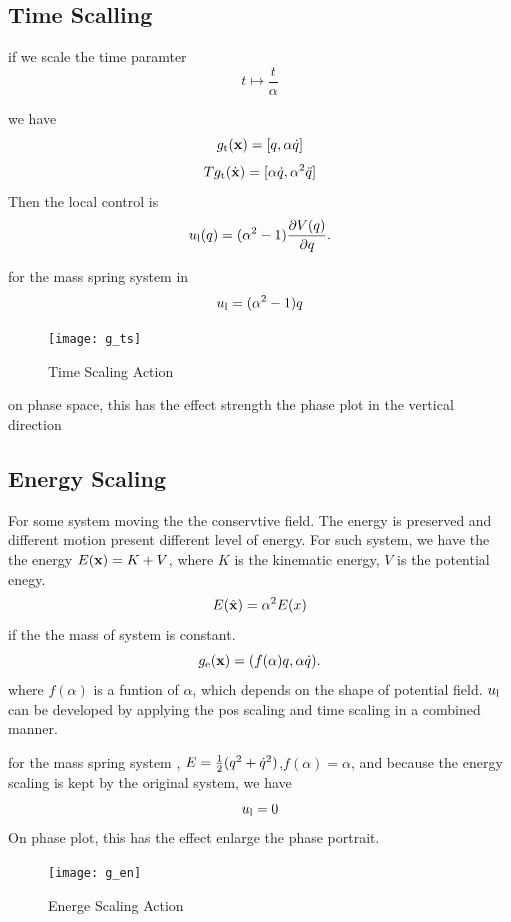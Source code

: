 \subsection*{Time Scalling}

if we scale the time paramter
\[
t \mapsto \frac{t}{\alpha}
\]

we have
\[
g_{\mathrm{t}}(\mathbf{x})=[q,\alpha \dot{q}]
\]
\[
Tg_{\mathrm{t}}(\dot{\mathbf{x}})=[\alpha \dot{q},\alpha^2 \ddot{q}]
\]
Then the local control is 
\begin{equation}
u_{\mathrm{l}}(q) = (\alpha^2 - 1) \frac{\partial V(q)}{\partial q}.
\end{equation}

for the mass spring system in
\[
u_{\mathrm{l}}=(\alpha^2-1)q
\] 

\begin{figure}[!htbp]
  \begin{center}
    \texttt{[image: g\_ts]}
	 \caption{Time Scaling Action}
    \label{fig:gts}
\end{center}
\end{figure}
on phase space, this has the effect strength the phase plot in the vertical direction

\subsection*{Energy Scaling}
For some system moving the the conservtive field.
The energy is preserved and different motion present different level of energy.
For such system, we have the the energy $E(\mathbf{x})=K+V$, where $K$ is the kinematic energy,
$V$ is the potential enegy.
\[
E(\hat{\mathbf{x}})=\alpha^2 E(x)
\]
if the the mass of system is constant.
\[
g_{\mathrm{e}}(\mathbf{x})=(f(\alpha) q,\alpha \dot{q}).
\]
where $f(\alpha)$ is a funtion of $\alpha$, which depends on the shape of potential field.
$u_{\mathrm{l}}$ can be developed by applying the pos scaling and time scaling in a combined manner.



for the mass spring system , $E=\frac{1}{2}(q^2+\dot{q}^2)$,$f(\alpha)=\alpha$, and because the energy scaling is kept by the original system, we have
\[
u_{\mathrm{l}}=0
\]
On phase plot, this has the effect enlarge the phase portrait.

\begin{figure}[!htbp]
  \begin{center}
      \texttt{[image: g\_en]}
    \caption{Energe Scaling Action}
    \label{fig:gen}
\end{center}
\end{figure}


